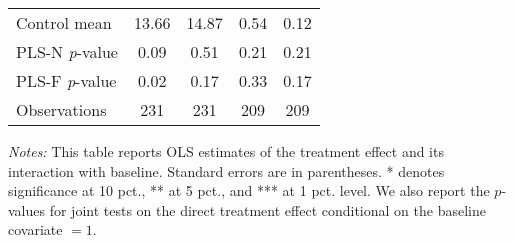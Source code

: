 \begin{table}[ht]
{\begin{threeparttable}
\begin{tabular}{l*{4}{c}}
Control mean    &    13.66         &    14.87         &     0.54         &     0.12         \\
PLS-N \emph{p}-value&     0.09         &     0.51         &     0.21         &     0.21         \\
PLS-F \emph{p}-value&     0.02         &     0.17         &     0.33         &     0.17         \\
Observations    &      231         &      231         &      209         &      209         \\
\bottomrule \end{tabular} \begin{tablenotes}[flushleft] \footnotesize \item \emph{Notes:} This table reports OLS estimates of the treatment effect and its interaction with baseline. Standard errors are in parentheses. * denotes significance at 10 pct., ** at 5 pct., and *** at 1 pct. level. We also report the \(p\)-values for joint tests on the direct treatment effect conditional on the baseline covariate $= 1$. \end{tablenotes} \end{threeparttable} } \end{table}

